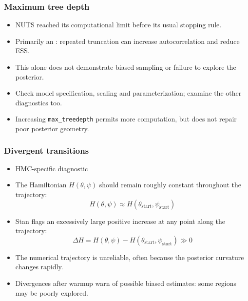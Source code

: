 \documentclass[10pt]{beamer}
\begin{document}
\begin{frame}

\frametitle{Maximum tree depth}

  \begin{itemize}
  \item NUTS reached its computational limit before its usual stopping rule.
  \item Primarily an : repeated truncation can
    increase autocorrelation and reduce ESS.
  \item This alone does not demonstrate biased sampling or failure to
    explore the posterior.
  \pause
  \item Check model specification, scaling and parameterization;
    examine the other diagnostics too.
  \item Increasing \texttt{max\_treedepth} permits more computation,
    but does not repair poor posterior geometry.
  \end{itemize}
\end{frame}

\begin{frame}
\frametitle{Divergent transitions}

\begin{itemize}
  \item HMC-specific diagnostic
  \pause
  \item The Hamiltonian $H(\theta, \psi) $ should remain roughly constant throughout the trajectory:
  \[
  H(\theta, \psi) \approx H(\theta_{\mathrm{start}}, \psi_{\mathrm{start}})
  \]
  \item Stan flags an excessively large positive increase at any point along the trajectory:
  \[
  \Delta H = H(\theta, \psi) - H(\theta_{\mathrm{start}}, \psi_{\mathrm{start}}) \gg 0
  \]
  \item The numerical trajectory is unreliable, often because the
    posterior curvature changes rapidly.
  \item Divergences after warmup warn of possible biased estimates:
    some regions may be poorly explored.
\end{itemize}



\end{frame}
\end{document}
